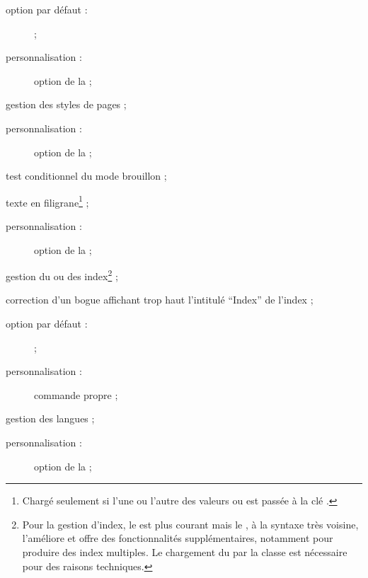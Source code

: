 \begin{description}
  \begin{description}
  \item[option par défaut :]  ;
  \item[personnalisation :] option de la \yatcl {} ;
  \end{description}
\item[\package*{titleps} :] gestion des styles de pages ;
  \begin{description}
  \item[personnalisation :] option de la \yatcl {} ;
  \end{description}
\item[\package{ifdraft} :] test conditionnel du mode brouillon ;
\item[\package*{draftwatermark} :] texte en filigrane\footnote{Chargé seulement
    si l'une ou l'autre des valeurs  ou 
    est passée à la clé .} ;
  \begin{description}
  \item[personnalisation :] option de la \yatcl {} ;
  \end{description}
\item[\package*{index} :] gestion du ou des index\footnote{Pour la gestion
    d'index, le  est plus courant mais le ,
    à la syntaxe très voisine, l'améliore et offre des fonctionnalités
    supplémentaires, notamment pour produire des index multiples. Le chargement
    du  par la classe est nécessaire pour des raisons
    techniques.} ;
\item[\package*{idxlayout} :] correction d'un bogue affichant trop haut
  l'intitulé \enquote{Index} de l'index ;
  \begin{description}
  \item[option par défaut :]  ;
  \item[personnalisation :] commande propre  ;
  \end{description}
\item[\package*{babel} :] gestion des langues ;
  \begin{description}
  \item[personnalisation :] option de la \yatcl {} ;

\end{description}
\end{description}
